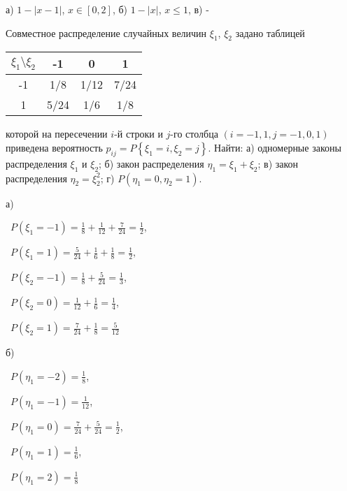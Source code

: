 \bigskip
\begin{result}
  а) $1 - |x - 1|$, $x \in [0, 2]$, б) $1 - |x|$, $x \le 1$, в) -
\end{result}
\medskip
\begin{task}{11}
  Совместное распределение случайных величин $\xi_1$, $\xi_2$ задано таблицей 
  
  \medskip
  \begin{tabular}{|c|c|c|c|}
  \hline
  $\xi_1  \setminus \xi_2$ & -1 & 0 & 1 \\
  \hline
  -1 & 1/8 & 1/12 & 7/24 \\
  \hline
  1 & 5/24 & 1/6 & 1/8 \\
  \hline
  \end{tabular}

   которой на пересечении $i$-й строки и $j$-го столбца $\left(i = -1, 1, j = -1, 0, 1\right)$ 
  приведена вероятность $p_{ij} = P\left\{\xi_1 = i, \xi_2 = j\right\}$. Найти:  а) одномерные законы
  распределения $\xi_1$ и $\xi_2$; б) закон распределения $\eta_1 = \xi_1 + \xi_2$; в) закон 
  распределения $\eta_2 = \xi_2^2$; г) $P\left(\eta_1 = 0, \eta_2 = 1\right)$.
\end{task}

\begin{subtask}{а)}

\noindent\textbullet~$P(\xi_1 = -1) = \frac{1}{8} + \frac{1}{12} + \frac{7}{24} = \frac{1}{2}$,

\smallskip
\noindent\textbullet~$P(\xi_1 = 1) = \frac{5}{24} + \frac{1}{6} + \frac{1}{8} = \frac{1}{2}$,

\medskip
\noindent\textbullet~$P(\xi_2 = -1) = \frac{1}{8} + \frac{5}{24} = \frac{1}{3}$,

\smallskip
\noindent\textbullet~$P(\xi_2 = 0) = \frac{1}{12} + \frac{1}{6} = \frac{1}{4}$,

\smallskip
\noindent\textbullet~$P(\xi_2 = 1) = \frac{7}{24} + \frac{1}{8} = \frac{5}{12}$
\end{subtask}

\begin{subtask}{б)}

\noindent\textbullet~$P(\eta_1 = -2) = \frac{1}{8}$,

\smallskip
\noindent\textbullet~$P(\eta_1 = -1) = \frac{1}{12}$,

\smallskip
\noindent\textbullet~$P(\eta_1 = 0) = \frac{7}{24} + \frac{5}{24} = \frac{1}{2}$,

\smallskip
\noindent\textbullet~$P(\eta_1 = 1) = \frac{1}{6}$,

\smallskip
\noindent\textbullet~$P(\eta_1 = 2) = \frac{1}{8}$
\end{subtask}

